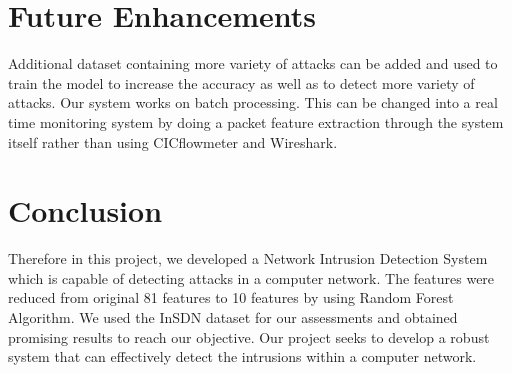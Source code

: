 \section{Future Enhancements}
\vspace{-18pt}
Additional dataset containing more variety of attacks can be added and used to train the model to increase the accuracy as well as to detect more variety of attacks. Our system works on batch processing. This can be changed into a real time monitoring system by doing a packet feature extraction through the system itself rather than using CICflowmeter and Wireshark.
\section{Conclusion}
\vspace{-18pt}
Therefore in this project, we developed a Network Intrusion Detection System which is capable of detecting attacks in a computer network. The features were reduced from original 81 features to 10 features  by using Random Forest Algorithm. We used the InSDN dataset for our assessments and obtained promising results to reach our objective. Our project seeks to develop a robust system that can effectively detect the intrusions within a computer network.
\newpage
\renewcommand\bibname{References} %

